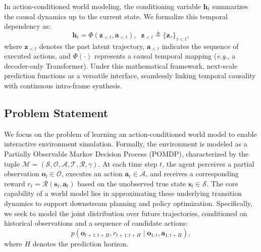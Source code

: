 In  action-conditioned world modeling, the conditioning variable $\boldsymbol{h}_t$ summarizes the causal dynamics up to the current state. We formalize this temporal dependency as:
\begin{equation}
\label{eq:temporal_context_def}
\boldsymbol{h}_t = \Phi(\boldsymbol{z}_{<t}, \boldsymbol{a}_{<t}), \;\; \boldsymbol{z}_{<t} \triangleq \{\boldsymbol{z}_\tau\}_{\tau < t},
\end{equation}
where $\boldsymbol{z}_{<t}$ denotes the past latent trajectory, $\boldsymbol{a}_{<t}$ indicates the sequence of executed actions, and $\Phi(\cdot)$ represents a causal temporal mapping (\textit{e.g.}, a decoder-only Transformer). Under this mathematical framework, next-scale prediction functions as a versatile interface, seamlessly linking temporal causality with continuous intra-frame synthesis.


\subsection{Problem Statement}
\label{subsec:problem_statement}
We focus on the problem of learning an action-conditioned world model to enable interactive environment simulation. Formally, the environment is modeled as a Partially Observable Markov Decision Process (POMDP), characterized by the tuple $\mathcal{M}=(\mathcal{S}, \mathcal{O}, \mathcal{A}, \mathcal{T}, \mathcal{R}, \gamma)$. At each time step $t$, the agent perceives a partial observation $\boldsymbol{o}_t \in \mathcal{O}$, executes an action $\boldsymbol{a}_t \in \mathcal{A}$, and receives a corresponding reward $r_t = \mathcal{R}(\boldsymbol{s}_t, \boldsymbol{a}_t)$ based on the unobserved true state $\boldsymbol{s}_t \in \mathcal{S}$. The core capability of a world model lies in approximating these underlying transition dynamics to support downstream planning and policy optimization. Specifically, we seek to model the joint distribution over future trajectories, conditioned on historical observations and a sequence of candidate actions:
\begin{equation}
\label{eq:wm_goal}
p(\boldsymbol{o}_{t+1:t+H}, r_{t+1:t+H} \mid \boldsymbol{o}_{1:t}, \boldsymbol{a}_{1:t+H}),
\end{equation}
where $H$ denotes the prediction horizon. 


